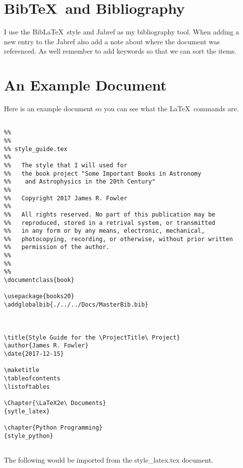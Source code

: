 \section{Bib\TeX\ and Bibliography}

I use the Bib\LaTeX\ style and Jabref \cite{Jabref} as my bibliography
tool.  When adding a new entry to the Jabref also add a note about where
the document was referenced. As well remember to add keywords so that we
can sort the items.

\section{An Example Document}

Here is an example document so you can see what the \LaTeX\ commands are.

\begin{verbatim}

%%
%%
%% style_guide.tex
%%
%%   The style that I will used for 
%%   the book project "Some Important Books in Astronomy
%%    and Astrophysics in the 20th Century"
%%
%%   Copyright 2017 James R. Fowler
%%
%%   All rights reserved. No part of this publication may be
%%   reproduced, stored in a retrival system, or transmitted
%%   in any form or by any means, electronic, mechanical,
%%   photocopying, recording, or otherwise, without prior written
%%   permission of the author.
%%
%%
%%
\documentclass{book}

\usepackage{books20}
\addglobalbib{./../../Docs/MasterBib.bib}



\title{Style Guide for the \ProjectTitle\ Project}
\author{James R. Fowler}
\date{2017-12-15}

\maketitle
\tableofcontents
\listoftables 

\Chapter{\LaTeX2e\ Documents}
{sytle_latex}

\chapter{Python Programming}
{style_python}


\end{verbatim}

 The following would be imported from  the style\_latex.tex document.


